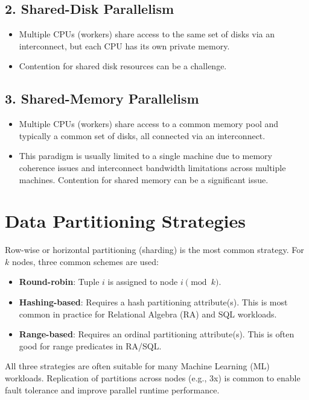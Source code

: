 \documentclass{article}
\begin{document}
\subsection*{2. Shared-Disk Parallelism}
\begin{itemize}
    \item Multiple CPUs (workers) share access to the same set of disks via an interconnect, but each CPU has its own private memory.
    \item Contention for shared disk resources can be a challenge.
\end{itemize}

\subsection*{3. Shared-Memory Parallelism}
\begin{itemize}
    \item Multiple CPUs (workers) share access to a common memory pool and typically a common set of disks, all connected via an interconnect.
    \item This paradigm is usually limited to a single machine due to memory coherence issues and interconnect bandwidth limitations across multiple machines. Contention for shared memory can be a significant issue.
\end{itemize}

\section*{Data Partitioning Strategies}
Row-wise or horizontal partitioning (sharding) is the most common strategy.
For $k$ nodes, three common schemes are used:
\begin{itemize}
    \item \textbf{Round-robin}: Tuple $i$ is assigned to node $i \pmod k$.
    \item \textbf{Hashing-based}: Requires a hash partitioning attribute(s). This is most common in practice for Relational Algebra (RA) and SQL workloads.
    \item \textbf{Range-based}: Requires an ordinal partitioning attribute(s). This is often good for range predicates in RA/SQL.
\end{itemize}
All three strategies are often suitable for many Machine Learning (ML) workloads.
Replication of partitions across nodes (e.g., 3x) is common to enable fault tolerance and improve parallel runtime performance.
\end{document}
